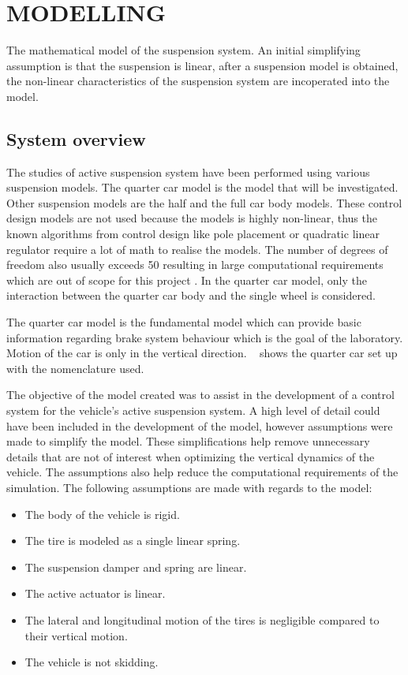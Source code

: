 \documentclass[10pt,twocolumn]{witseiepaper}
\begin{document}
\section{MODELLING} 
The mathematical model of the suspension system. An initial simplifying assumption is that the suspension is linear, after a suspension model is obtained, the non-linear characteristics of the suspension system are incoperated into the model.

\subsection{System overview}

The studies of active suspension system have been performed using various suspension models. The quarter car model is the model that will be investigated. Other suspension models are the half and the full car body models. These control design models are not used because the models is highly non-linear, thus the known algorithms from control design like pole placement or quadratic linear regulator require a lot of math to realise the models. The number of degrees of freedom also usually exceeds 50 resulting in large computational requirements which are out of scope for this project \cite{Sharp:1987}. In the quarter car model, only the interaction between the quarter car body and the single wheel is considered.

The quarter car model is the fundamental model which can provide basic information regarding brake system behaviour which is the goal of the laboratory. Motion of the car is only in the vertical direction. ~ shows the quarter car set up with the nomenclature used. 

The objective of the model created was to assist in the development of a control system for the vehicle’s active suspension system. A high level of detail could have been included in the development of the model, however assumptions were made to simplify the model. These simplifications help remove unnecessary details that are not of interest when optimizing the vertical dynamics of the vehicle. The assumptions also help reduce the computational requirements of the simulation. The following assumptions are made with regards to the model:
\begin{itemize}
	\item The body of the vehicle is rigid.
	\item The tire is modeled as a single linear spring.
	\item The suspension damper and spring are linear.
	\item The active actuator is linear.
	\item The lateral and longitudinal motion of the tires is negligible compared to their vertical motion.
	\item The vehicle is not skidding.
\end{itemize}
\end{document}
